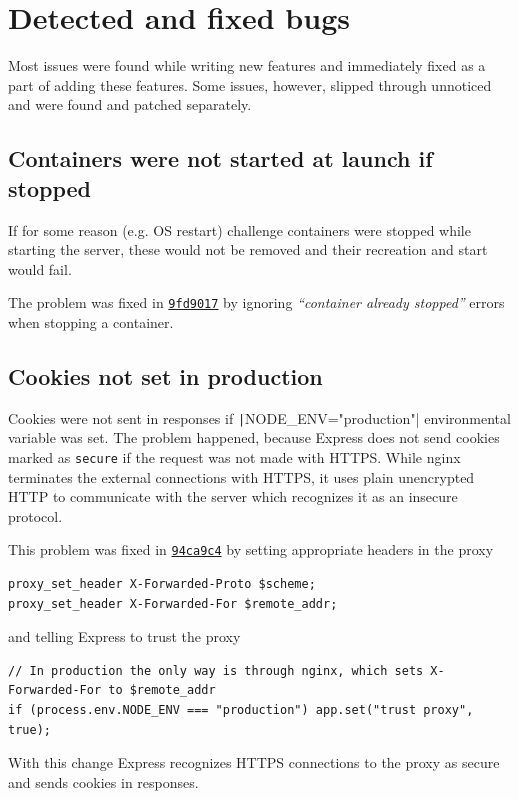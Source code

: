 \section{Detected and fixed bugs}
\label{sec:bugs}

Most issues were found while writing new features and immediately fixed as a part of adding these features. Some issues, however, slipped through unnoticed and were found and patched separately.

\subsection{Containers were not started at launch if stopped}

If for some reason (e.g. OS restart) challenge containers were stopped while starting the server, these would not be removed and their recreation and start would fail.

The problem was fixed in \href{https://github.com/krzysdz/inz/commit/9fd9017ce994f577233ce0544bbd0cf1df3e0e55}{\texttt{9fd9017}} by ignoring \textit{\enquote{container already stopped}} errors when stopping a container.

\subsection{Cookies not set in production}

Cookies were not sent in responses if \texttt|NODE_ENV="production"| environmental variable was set. The problem happened, because Express does not send cookies marked as \texttt{secure} if the request was not made with HTTPS. While nginx terminates the external connections with HTTPS, it uses plain unencrypted HTTP to communicate with the server which recognizes it as an insecure protocol.

This problem was fixed in \href{https://github.com/krzysdz/inz/commit/94ca9c4124954c94c9fe8e27dc59305aa59b31ad}{\texttt{94ca9c4}} by setting appropriate headers in the proxy
\begin{verbatim}
proxy_set_header X-Forwarded-Proto $scheme;
proxy_set_header X-Forwarded-For $remote_addr;
\end{verbatim}
and telling Express to trust the proxy
\begin{verbatim}
// In production the only way is through nginx, which sets X-Forwarded-For to $remote_addr
if (process.env.NODE_ENV === "production") app.set("trust proxy", true);
\end{verbatim}
With this change Express recognizes HTTPS connections to the proxy as secure and sends cookies in responses.

